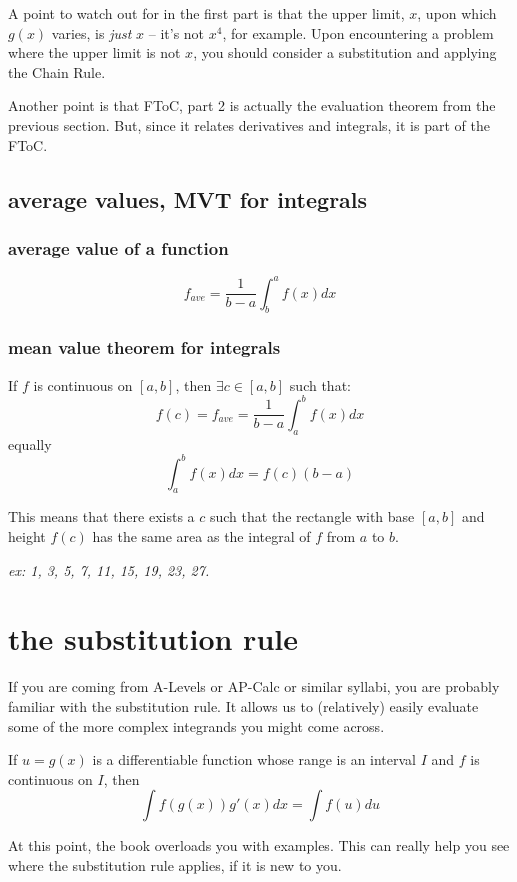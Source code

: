 \documentclass[10pt,a4paper]{report}
\begin{document}
A point to watch out for in the first part is that the upper limit, $x$, upon which $g(x)$ varies, is \emph{just} $x$ -- it's not $x^4$, for example. Upon encountering a problem where the upper limit is not $x$, you should consider a substitution and applying the Chain Rule.

Another point is that FToC, part 2 is actually the evaluation theorem from the previous section. But, since it relates derivatives and integrals, it is part of the FToC.

\subsection{average values, MVT for integrals}

\subsubsection{average value of a function}

$$
	f_{ave} = \frac{1}{b - a} \int_b^a f(x)dx
$$

\subsubsection{mean value theorem for integrals}

If $f$ is continuous on $[a, b]$, then $\exists c \in [a, b]$ such that:
$$
	f(c) = f_{ave} = \frac{1}{b - a} \int_a^b f(x)dx
$$
equally
$$
	\int_a^b f(x) dx = f(c) (b - a)
$$

This means that there exists a $c$ such that the rectangle with base $[a, b]$ and height $f(c)$ has the same area as the integral of $f$ from $a$ to $b$.

\emph{ex: 1, 3, 5, 7, 11, 15, 19, 23, 27.}

\section{the substitution rule}

If you are coming from A-Levels or AP-Calc or similar syllabi, you are probably familiar with the substitution rule. It allows us to (relatively) easily evaluate some of the more complex integrands you might come across.

If $u = g(x)$ is a differentiable function whose range is an interval $I$ and $f$ is continuous on $I$, then
$$
	\int f(g(x))g'(x) dx = \int f(u) du
$$

At this point, the book overloads you with examples. This can really help you see where the substitution rule applies, if it is new to you.
\end{document}
